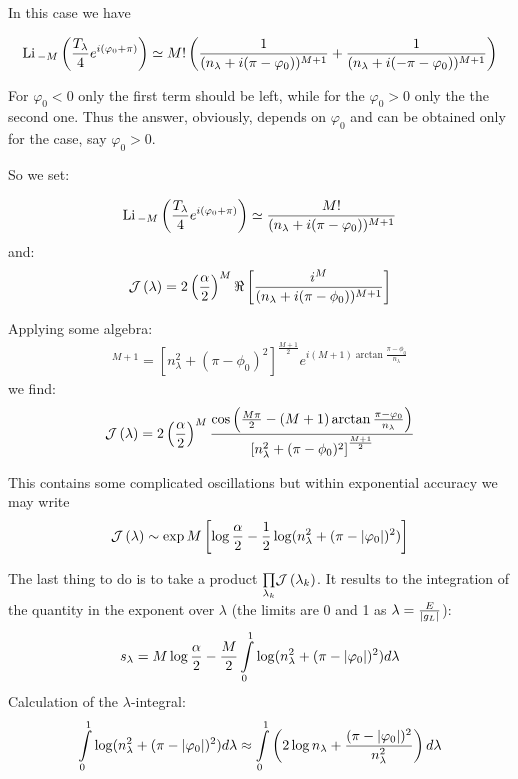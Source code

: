 In this case  we have

\begin{gather}
	\mathrm{Li}\,_{-M}\left(\frac{T_{\lambda}}{4}e^{i(\varphi_{0}+\pi)}\right)\simeq M!\left(\frac{1}{(n_{\lambda}+i(\pi-\varphi_{0}))^{M+1}}+\frac{1}{(n_{\lambda}+i(-\pi-\varphi_{0}))^{M+1}}\right)
\end{gather}

For $ \varphi_0<0 $ only the first term should be left, while for the $ \varphi_0>0 $ only the the second one. Thus the answer, obviously, depends on $ \varphi_0 $ and can be obtained only for the case, say $ \varphi_0>0 $.

So we set:

\begin{gather}
\mathrm{Li}\,_{-M}\left(\frac{T_{\lambda}}{4}e^{i(\varphi_{0}+\pi)}\right)
\simeq \frac{M!}{(n_{\lambda}+i(\pi-\varphi_{0}))^{M+1}}
\end{gather}
and:
\begin{gather}
	\mathcal{J}\left(\lambda\right)
	=
	2\left(\frac{\alpha}{2}\right)^{M}
	\Re
	\left[\frac{i^{M}}{(n_{\lambda}+i(\pi-\phi_{0}))^{M+1}}\right]
\end{gather}

Applying some algebra:
\begin{gather}
	[n_{\lambda}+i(\pi-\phi_{0})]^{M+1}=\left[n_{\lambda}^{2}+(\pi-\phi_{0})^{2}\right]^{\frac{M+1}{2}}e^{i(M+1)\arctan\frac{\pi-\phi_{0}}{n_{\lambda}}}
\end{gather}
 we find:
\begin{gather}
	\mathcal{J}\left(\lambda\right)
	=
	2\left(\frac{\alpha}{2}\right)^{M}\frac{\cos\left(\frac{M\pi}{2}-(M+1)\arctan\frac{\pi-\varphi_{0}}{n_{\lambda}}\right)}{\left[n_{\lambda}^{2}+(\pi-\phi_{0})^{2}\right]^{\frac{M+1}{2}}}
\end{gather}

This contains some complicated oscillations but within exponential
accuracy we may write
\begin{gather}
	\mathcal{J}\left(\lambda\right)
	\sim
	\exp M\left[\log\frac{\alpha}{2}-\frac{1}{2}\log(n_{\lambda}^{2}+(\pi-|\varphi_{0}|)^{2})\right]
\end{gather}

The last thing to do is to take a product $  \underset{\lambda_k}{\prod} \mathcal{J}\left(\lambda_k\right) $. It results to the integration of the quantity in the exponent over $ \lambda $ (the limits are 0 and 1 as $ \lambda = \frac{E}{\left|g_L\right|}$):
\begin{gather}
s_{\lambda} 
 =
M\log\frac{\alpha}{2}
-
\frac{M}{2}
\intop_{0}^{1}\log(n_{\lambda}^{2}+(\pi-|\varphi_{0}|)^{2})d\lambda
\end{gather}
Calculation of the $\lambda$-integral:
\begin{gather}
\label{pure_msr_lambda_integral}
\intop_{0}^{1}\log(n_{\lambda}^{2}+(\pi-|\varphi_{0}|)^{2})d\lambda
	\approx
	\intop_{0}^{1}\left(2\log n_{\lambda}+\frac{(\pi-|\varphi_{0}|)^{2}}{n_{\lambda}^{2}}\right)d\lambda
\end{gather}

